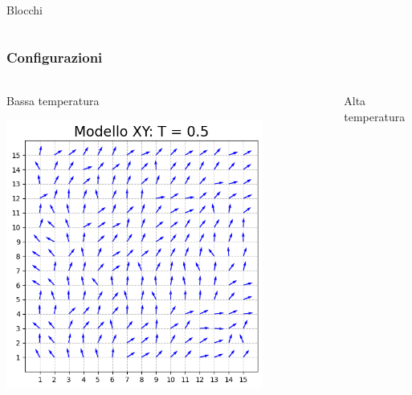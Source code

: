 \begin{frame}
\begin{columns}
\begin{column}{0.33\textwidth}
\begin{block}{Blocchi}
            \end{block}        
        \end{column}
    \end{columns}
\end{frame}



\begin{frame}
    \frametitle{Configurazioni}
    \framesubtitle{}

    \begin{columns}
        \begin{column}{0.5\textwidth}
            \begin{block}{Bassa temperatura}

            \centering
            \includegraphics[width=0.8\textwidth]{Immagini/simXY/conf_T0.5.png}

            \end{block}
        \end{column}
    
        \begin{column}{0.5\textwidth}
            \begin{block}{Alta temperatura}


\end{block}
\end{column}
\end{columns}
\end{frame}

